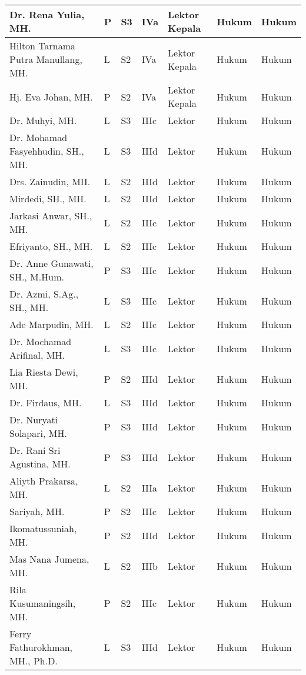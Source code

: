 \documentclass[
]{book}
\begin{document}
\begin{longtable}{l|l|l|l|l|l|l}
\hline
Dr. Rena Yulia, MH. & P & S3 & IVa & Lektor Kepala & Hukum & Hukum\\
\hline
Hilton Tarnama Putra Manullang, MH. & L & S2 & IVa & Lektor Kepala & Hukum & Hukum\\
\hline
Hj. Eva Johan, MH. & P & S2 & IVa & Lektor Kepala & Hukum & Hukum\\
\hline
Dr. Muhyi, MH. & L & S3 & IIIc & Lektor & Hukum & Hukum\\
\hline
Dr. Mohamad Fasyehhudin, SH., MH. & L & S3 & IIId & Lektor & Hukum & Hukum\\
\hline
Drs. Zainudin, MH. & L & S2 & IIId & Lektor & Hukum & Hukum\\
\hline
Mirdedi, SH., MH. & L & S2 & IIId & Lektor & Hukum & Hukum\\
\hline
Jarkasi Anwar, SH., MH. & L & S2 & IIIc & Lektor & Hukum & Hukum\\
\hline
Efriyanto, SH., MH. & L & S2 & IIIc & Lektor & Hukum & Hukum\\
\hline
Dr. Anne Gunawati, SH., M.Hum. & P & S3 & IIIc & Lektor & Hukum & Hukum\\
\hline
Dr. Azmi, S.Ag., SH., MH. & L & S3 & IIIc & Lektor & Hukum & Hukum\\
\hline
Ade Marpudin, MH. & L & S2 & IIIc & Lektor & Hukum & Hukum\\
\hline
Dr. Mochamad Arifinal, MH. & L & S3 & IIIc & Lektor & Hukum & Hukum\\
\hline
Lia Riesta Dewi, MH. & P & S2 & IIId & Lektor & Hukum & Hukum\\
\hline
Dr. Firdaus, MH. & L & S3 & IIId & Lektor & Hukum & Hukum\\
\hline
Dr. Nuryati Solapari, MH. & P & S3 & IIId & Lektor & Hukum & Hukum\\
\hline
Dr. Rani Sri Agustina, MH. & P & S3 & IIId & Lektor & Hukum & Hukum\\
\hline
Aliyth Prakarsa, MH. & L & S2 & IIIa & Lektor & Hukum & Hukum\\
\hline
Sariyah, MH. & P & S2 & IIIc & Lektor & Hukum & Hukum\\
\hline
Ikomatussuniah, MH. & P & S2 & IIId & Lektor & Hukum & Hukum\\
\hline
Mas Nana Jumena, MH. & L & S2 & IIIb & Lektor & Hukum & Hukum\\
\hline
Rila Kusumaningsih, MH. & P & S2 & IIIc & Lektor & Hukum & Hukum\\
\hline
Ferry Fathurokhman, MH., Ph.D. & L & S3 & IIId & Lektor & Hukum & Hukum\\

\end{longtable}
\end{document}
